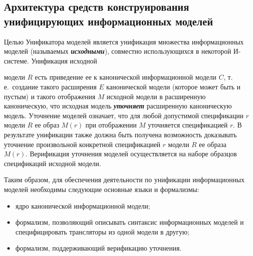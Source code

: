 \begin{multicols}{2}


\section{Архитектура средств конструирования унифицирующих информационных моделей}

Целью Унификатора моделей является унификация множества информационных моделей
(называемых {\bfseries\textit{исходными}}), совместно использующихся в некоторой
И-системе. Унификация исходной\linebreak
\vspace*{-12pt}
\pagebreak

\noindent
модели $R$ есть приведение ее к канонической 
информационной модели $C$, т.\,е.\ создание такого
расширения $E$ канонической модели (которое может быть и пустым) и
такого отображения $M$ исходной модели в расширенную каноническую, что
исходная модель {\bfseries\textit{уточняет}} расширенную каноническую модель. Уточнение
моделей означает, что для любой допустимой спецификации $r$ модели $R$ ее
образ $M(r)$ при отображении $M$ уточняется спецификацией $r$.
В результате унификации также должна
быть получена возможность доказывать уточнение произвольной конкретной
спецификацией $r$ модели $R$ ее образа $M(r)$.
Верификация уточнения моделей осуществляется на наборе образцов
спецификаций исходной модели.

Таким образом, для обеспечения деятельности по унификации
информационных моделей необходимы следующие основные языки и формализмы:
\begin{itemize}
\item ядро канонической информационной модели;
\item формализм, позволяющий описывать синтаксис информационных моделей и
специфицировать трансляторы из одной модели в другую;
\item формализм, поддерживающий верификацию уточнения.
\end{itemize}


\end{multicols}
